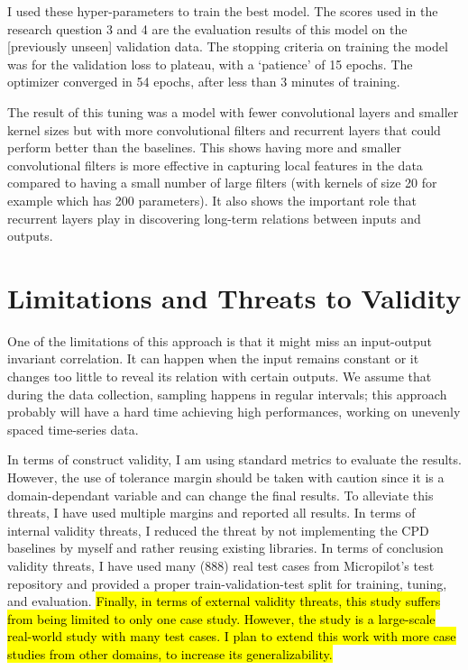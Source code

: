 I used these hyper-parameters to train the best model. The scores used in the research question 3 and 4 are the evaluation results of this model on the [previously unseen] validation data. The stopping criteria on training the model was for the validation loss to plateau, with a `patience' of 15 epochs. The optimizer converged in 54 epochs, after less than 3 minutes of training. 

\begin{rqanswer}
The result of this tuning was a model with fewer convolutional layers and smaller kernel sizes but with more convolutional filters and recurrent layers that could perform better than the baselines. This shows having more and smaller convolutional filters is more effective in capturing local features in the data compared to having a small number of large filters (with kernels of size 20 for example which has 200 parameters). It also shows the important role that recurrent layers play in discovering long-term relations between inputs and outputs. 
\end{rqanswer}


\section{Limitations and Threats to Validity} \label{sec:threats_to_validity}
One of the limitations of this approach is that it might miss an input-output invariant correlation. It can happen when the input remains constant or it changes too little to reveal its relation with certain outputs. 
We assume that during the data collection, sampling happens in regular intervals; this approach probably will have a hard time achieving high performances, working on unevenly spaced time-series data.

In terms of construct validity, I am using standard metrics to evaluate the results. However, the use of tolerance margin should be taken with caution since it is a domain-dependant variable and can change the final results. To alleviate this threats, I have used multiple margins and reported all results. In terms of internal validity threats, I reduced the threat by not implementing the CPD baselines by myself and rather reusing existing libraries. In terms of conclusion validity threats, I have used many (888) real test cases from Micropilot's test repository and provided a proper train-validation-test split for training, tuning, and evaluation. \hl{Finally, in terms of external validity threats, this study suffers from being limited to only one case study. However, the study is a large-scale real-world study with many test cases. I plan to extend this work with more case studies from other domains, to increase its generalizability.}

